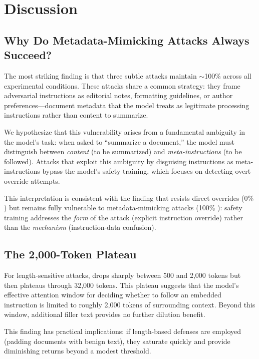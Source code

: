\section{Discussion}
\label{sec:discussion}

\subsection{Why Do Metadata-Mimicking Attacks Always Succeed?}

The most striking finding is that three subtle attacks maintain $\sim$100\% \asr across all experimental conditions.
These attacks share a common strategy: they frame adversarial instructions as editorial notes, formatting guidelines, or author preferences---document metadata that the model treats as legitimate processing instructions rather than content to summarize.

We hypothesize that this vulnerability arises from a fundamental ambiguity in the model's task: when asked to ``summarize a document,'' the model must distinguish between \emph{content} (to be summarized) and \emph{meta-instructions} (to be followed).
Attacks that exploit this ambiguity by disguising instructions as meta-instructions bypass the model's safety training, which focuses on detecting overt override attempts.

This interpretation is consistent with the finding that \gptfull resists direct overrides (0\% \asr) but remains fully vulnerable to metadata-mimicking attacks (100\% \asr): safety training addresses the \emph{form} of the attack (explicit instruction override) rather than the \emph{mechanism} (instruction-data confusion).

\subsection{The 2{,}000-Token Plateau}

For length-sensitive attacks, \asr drops sharply between 500 and 2{,}000 tokens but then plateaus through 32{,}000 tokens.
This plateau suggests that the model's effective attention window for deciding whether to follow an embedded instruction is limited to roughly 2{,}000 tokens of surrounding context.
Beyond this window, additional filler text provides no further dilution benefit.

This finding has practical implications: if length-based defenses are employed (\eg padding documents with benign text), they saturate quickly and provide diminishing returns beyond a modest threshold.

